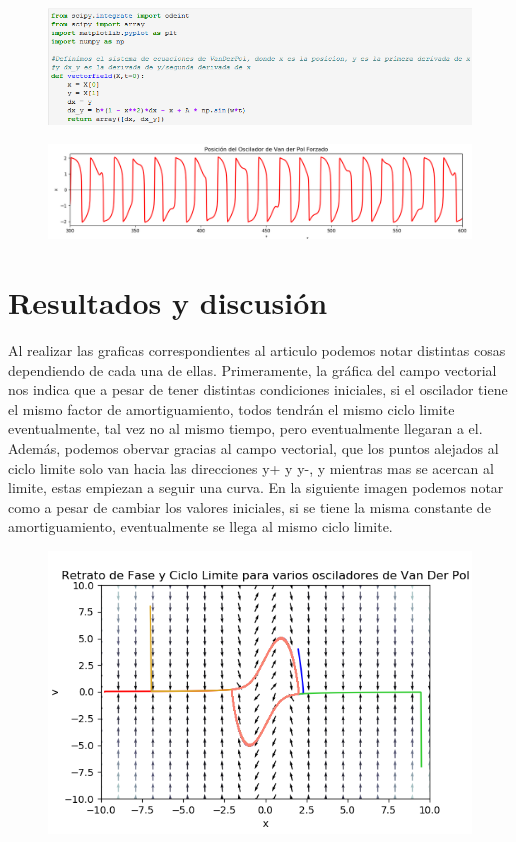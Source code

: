 \documentclass[12pt]{article}
\begin{document}
\begin{figure}[h!]
    \centering
\includegraphics[width=5in]{Cod3.png}
\end{figure}

\begin{figure}[h!]
    \centering
\includegraphics[width=6in]{Im4.png}
\end{figure}

\section{Resultados y discusión}
Al realizar las graficas correspondientes al articulo podemos notar distintas cosas dependiendo de cada una de ellas. Primeramente, la gráfica del campo vectorial nos indica que a pesar de tener distintas condiciones iniciales, si el oscilador tiene el mismo factor de amortiguamiento, todos tendrán el mismo ciclo limite eventualmente, tal vez no al mismo tiempo, pero eventualmente llegaran a el. Además, podemos obervar gracias al campo vectorial, que los puntos alejados al ciclo limite solo van hacia las direcciones y+ y y-, y mientras mas se acercan al limite, estas empiezan a seguir una curva. En la siguiente imagen podemos notar como a pesar de cambiar los valores iniciales, si se tiene la misma constante de amortiguamiento, eventualmente se llega al mismo ciclo limite. \\

\begin{figure}[h!]
    \centering
\includegraphics[width=5in]{Im5.png}
\end{figure}
\end{document}
